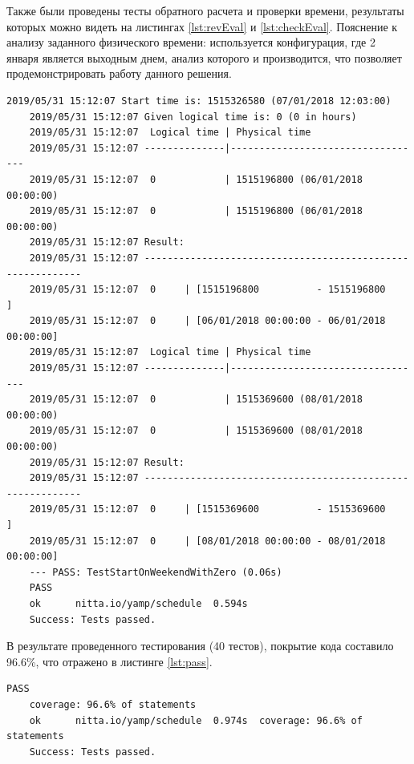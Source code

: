 \indent Также были проведены тесты обратного расчета и проверки времени, результаты которых можно видеть на листингах \ref{lst:revEval} и \ref{lst:checkEval}.
Пояснение к анализу заданного физического времени: используется конфигурация, где 2 января является выходным днем, анализ которого и производится, что позволяет продемонстрировать работу данного решения.


\begin{lstlisting}[caption={Пример анализа заданного физического времени},label={lst:checkEval}]
	2019/05/31 15:12:07 Start time is: 1515326580 (07/01/2018 12:03:00)
	2019/05/31 15:12:07 Given logical time is: 0 (0 in hours)
	2019/05/31 15:12:07  Logical time | Physical time
	2019/05/31 15:12:07 --------------|----------------------------------
	2019/05/31 15:12:07  0            | 1515196800 (06/01/2018 00:00:00)
	2019/05/31 15:12:07  0            | 1515196800 (06/01/2018 00:00:00)
	2019/05/31 15:12:07 Result:
	2019/05/31 15:12:07 -----------------------------------------------------------
	2019/05/31 15:12:07  0     | [1515196800          - 1515196800         ]
	2019/05/31 15:12:07  0     | [06/01/2018 00:00:00 - 06/01/2018 00:00:00]
	2019/05/31 15:12:07  Logical time | Physical time
	2019/05/31 15:12:07 --------------|----------------------------------
	2019/05/31 15:12:07  0            | 1515369600 (08/01/2018 00:00:00)
	2019/05/31 15:12:07  0            | 1515369600 (08/01/2018 00:00:00)
	2019/05/31 15:12:07 Result:
	2019/05/31 15:12:07 -----------------------------------------------------------
	2019/05/31 15:12:07  0     | [1515369600          - 1515369600         ]
	2019/05/31 15:12:07  0     | [08/01/2018 00:00:00 - 08/01/2018 00:00:00]
	--- PASS: TestStartOnWeekendWithZero (0.06s)
	PASS
	ok  	nitta.io/yamp/schedule	0.594s
	Success: Tests passed.
\end{lstlisting}

\indent В результате проведенного тестирования (40 тестов), покрытие кода составило 96.6\%, что отражено в листинге \ref{lst:pass}.

\begin{lstlisting}[caption={Тестовое покрытие кода},label={lst:pass}]
	PASS
	coverage: 96.6% of statements
	ok  	nitta.io/yamp/schedule	0.974s	coverage: 96.6% of statements
	Success: Tests passed.
\end{lstlisting}

